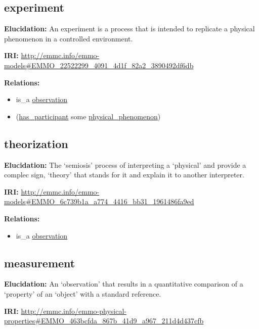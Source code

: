 \documentclass[a4paper,]{report}
\providecommand{\tightlist}{%
  \setlength{\itemsep}{0pt}\setlength{\parskip}{0pt}}
\begin{document}
\hypertarget{experiment}{%
\subsection{experiment}\label{experiment}}

\textbf{Elucidation:} An experiment is a process that is intended to
replicate a physical phenomenon in a controlled environment.

\textbf{IRI:}
\url{http://emmc.info/emmo-models\#EMMO_22522299_4091_4d1f_82a2_3890492df6db}

\textbf{Relations:}

\begin{itemize}
\tightlist
\item
  is\_a \protect\hyperlink{observation}{observation}
\item
  (\protect\hyperlink{has_participant}{has\_participant} some
  \protect\hyperlink{physical_phenomenon}{physical\_phenomenon})
\end{itemize}

\hypertarget{theorization}{%
\subsection{theorization}\label{theorization}}

\textbf{Elucidation:} The `semiosis' process of interpreting a
`physical' and provide a complec sign, `theory' that stands for it and
explain it to another interpreter.

\textbf{IRI:}
\url{http://emmc.info/emmo-models\#EMMO_6c739b1a_a774_4416_bb31_1961486fa9ed}

\textbf{Relations:}

\begin{itemize}
\tightlist
\item
  is\_a \protect\hyperlink{observation}{observation}
\end{itemize}

\hypertarget{measurement}{%
\subsection{measurement}\label{measurement}}

\textbf{Elucidation:} An `observation' that results in a quantitative
comparison of a `property' of an `object' with a standard reference.

\textbf{IRI:}
\url{http://emmc.info/emmo-physical-properties\#EMMO_463bcfda_867b_41d9_a967_211d4d437cfb}
\end{document}
